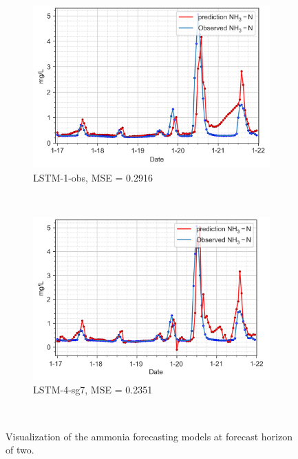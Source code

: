 \begin{figure}[!ht]
  \centering
  \begin{subfigure}[t]{0.75\textwidth}
    \includegraphics[width=\linewidth]{imgs/results/steps/nh3-lstm-1-fc2.png}
    \caption{LSTM-1-obs, MSE = 0.2916} \label{fig:nh3-lstm-1-fc2}
  \end{subfigure}\\
  \vspace{2em}
  \begin{subfigure}[t]{0.75\textwidth}
    \includegraphics[width=\linewidth]{imgs/results/steps/nh3-lstm-4-fc2.png}
    \caption{LSTM-4-sg7, MSE = 0.2351} \label{fig:nh3-lstm-4-fc2}
  \end{subfigure}\\
\caption{Visualization of the ammonia forecasting models at forecast horizon of two.} \label{fig:nh3-forecast-fc2}
\end{figure}

